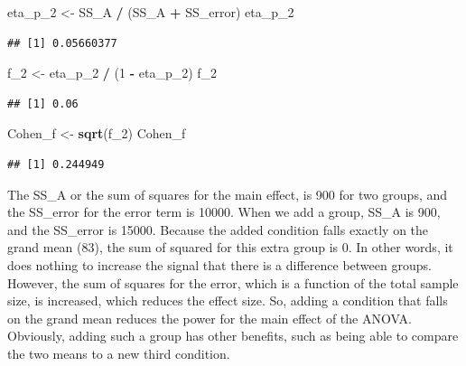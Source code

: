 \documentclass[]{book}
\newenvironment{Shaded}{\begin{snugshade}}{\end{snugshade}}
\newcommand{\DecValTok}[1]{\textcolor[rgb]{0.00,0.00,0.81}{#1}}
\newcommand{\KeywordTok}[1]{\textcolor[rgb]{0.13,0.29,0.53}{\textbf{#1}}}
\newcommand{\NormalTok}[1]{#1}
\newcommand{\OperatorTok}[1]{\textcolor[rgb]{0.81,0.36,0.00}{\textbf{#1}}}
\newcommand{\StringTok}[1]{\textcolor[rgb]{0.31,0.60,0.02}{#1}}
\begin{document}
\begin{Shaded}
\begin{Highlighting}[]
\NormalTok{eta_p_}\DecValTok{2}\NormalTok{ <-}\StringTok{ }\NormalTok{SS_A }\OperatorTok{/}\StringTok{ }\NormalTok{(SS_A }\OperatorTok{+}\StringTok{ }\NormalTok{SS_error)}
\NormalTok{eta_p_}\DecValTok{2}
\end{Highlighting}
\end{Shaded}

\begin{verbatim}
## [1] 0.05660377
\end{verbatim}

\begin{Shaded}
\begin{Highlighting}[]
\NormalTok{f_}\DecValTok{2}\NormalTok{ <-}\StringTok{ }\NormalTok{eta_p_}\DecValTok{2} \OperatorTok{/}\StringTok{ }\NormalTok{(}\DecValTok{1} \OperatorTok{-}\StringTok{ }\NormalTok{eta_p_}\DecValTok{2}\NormalTok{)}
\NormalTok{f_}\DecValTok{2}
\end{Highlighting}
\end{Shaded}

\begin{verbatim}
## [1] 0.06
\end{verbatim}

\begin{Shaded}
\begin{Highlighting}[]
\NormalTok{Cohen_f <-}\StringTok{ }\KeywordTok{sqrt}\NormalTok{(f_}\DecValTok{2}\NormalTok{)}
\NormalTok{Cohen_f}
\end{Highlighting}
\end{Shaded}

\begin{verbatim}
## [1] 0.244949
\end{verbatim}

The SS\_A or the sum of squares for the main effect, is 900 for two groups, and the SS\_error for the error term is 10000. When we add a group, SS\_A is 900, and the SS\_error is 15000. Because the added condition falls exactly on the grand mean (83), the sum of squared for this extra group is 0. In other words, it does nothing to increase the signal that there is a difference between groups. However, the sum of squares for the error, which is a function of the total sample size, is increased, which reduces the effect size. So, adding a condition that falls on the grand mean reduces the power for the main effect of the ANOVA. Obviously, adding such a group has other benefits, such as being able to compare the two means to a new third condition.
\end{document}
